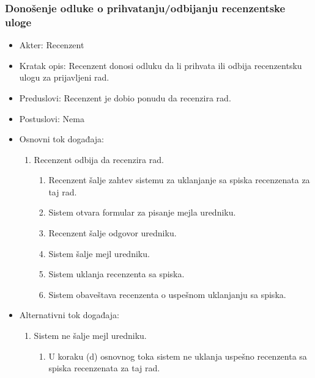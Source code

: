 \documentclass[a4paper]{article}
\begin{document}
\subsubsection{Donošenje odluke o prihvatanju/odbijanju recenzentske uloge}
\begin{itemize}
    \item Akter: Recenzent
    \item Kratak opis: Recenzent donosi odluku da li prihvata ili odbija recenzentsku ulogu za prijavljeni rad.
    \item Preduslovi: Recenzent je dobio ponudu da recenzira rad.
    \item Postuslovi: Nema
    \item Osnovni tok događaja:
        \begin{enumerate}
            \item Recenzent odbija da recenzira rad.
                \begin{enumerate}
                    \item Recenzent šalje zahtev sistemu za uklanjanje sa spiska recenzenata za taj rad.
                    \item Sistem otvara formular za pisanje mejla uredniku.
                    \item Recenzent šalje odgovor uredniku.
                    \item Sistem šalje mejl uredniku.
                    \item Sistem uklanja recenzenta sa spiska.
                    \item Sistem obaveštava recenzenta o uspešnom uklanjanju sa spiska.
                \end{enumerate}
        \end{enumerate}
    \item Alternativni tok događaja:
        \begin{enumerate}
            \item Sistem ne šalje mejl uredniku.
            \begin{enumerate}
                \item U koraku (d) osnovnog toka sistem ne uklanja uspešno recenzenta sa spiska recenzenata za taj rad.

\end{enumerate}
\end{enumerate}
\end{itemize}
\end{document}
